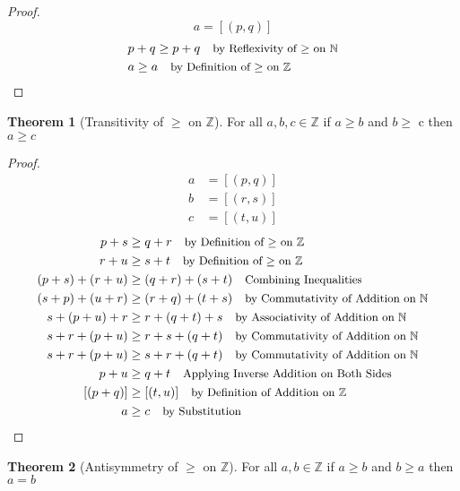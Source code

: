 \documentclass[12pt]{article}
\newcommand{\stext}[1]{\quad\text{\small #1}}
\theoremstyle{definition}
\newtheorem{theorem}{Theorem}
\begin{document}
\begin{proof}
    \begin{equation*}
        a = [(p, q)] 
    \end{equation*}
    \begin{align*}
        &p + q \geq p + q \stext{by Reflexivity of $\geq$ on $\mathbb{N}$} \\
        & a \geq a \stext{by Definition of $\geq$ on $\mathbb{Z}$}
    \end{align*}
\end{proof}
\begin{theorem}[Transitivity of $\geq$ on $\mathbb{Z}$]
    For all $a, b, c \in \mathbb{Z}$ if $a \geq b$ and $b \geq$ c then $a \geq c$
\end{theorem}
\begin{proof}
    \begin{align*}
        a &= [(p, q)] \\ 
        b &= [(r, s)] \\ 
        c &= [(t, u)]
    \end{align*}
    \begin{align*}
        p + s &\geq q + r \stext{by Definition of $\geq$ on $\mathbb{Z}$}\\
        r + u &\geq s + t \stext{by Definition of $\geq$ on $\mathbb{Z}$}\\ 
        (p + s) + (r + u) &\geq (q + r) + (s + t) \stext{Combining Inequalities}\\
        (s + p) + (u + r) &\geq (r + q) + (t + s) \stext{by Commutativity of Addition on $\mathbb{N}$}\\ 
        s + (p + u) + r &\geq r + (q + t) + s \stext{by Associativity of Addition on $\mathbb{N}$}\\
        s + r + (p + u) &\geq r + s + (q + t) \stext{by Commutativity of Addition on $\mathbb{N}$}\\
        s + r + (p + u) &\geq s + r + (q + t) \stext{by Commutativity of Addition on $\mathbb{N}$}\\
        p + u &\geq q + t \stext{Applying Inverse Addition on Both Sides}\\ 
        [(p + q)] &\geq [(t, u)] \stext{by Definition of Addition on $\mathbb{Z}$}\\
        a &\geq c \stext{by Substitution}
    \end{align*}
\end{proof}
\begin{theorem}[Antisymmetry of $\geq$ on $\mathbb{Z}$]
    For all $a, b \in \mathbb{Z}$ if $a \geq b$ and $b \geq a$ then $a = b$
\end{theorem}
\end{document}
